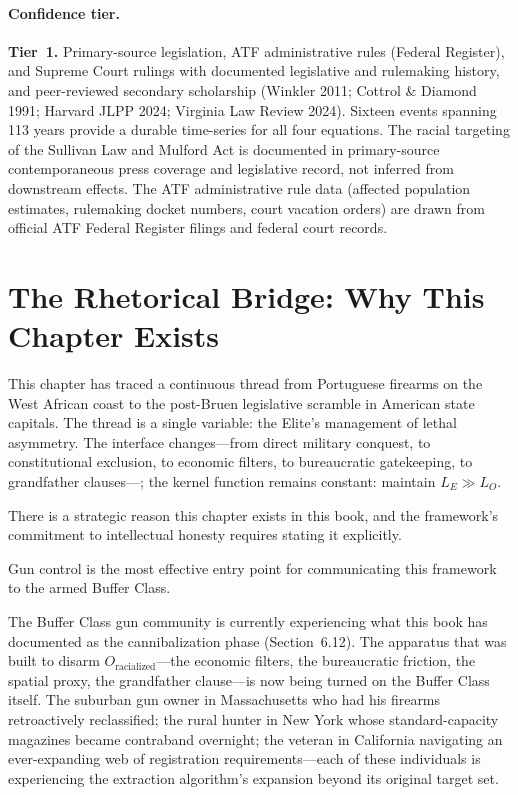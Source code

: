\paragraph{Confidence tier.}
\textbf{Tier~1.} Primary-source legislation, ATF administrative rules (Federal Register), and Supreme Court rulings with documented legislative and rulemaking history, and peer-reviewed secondary scholarship (Winkler 2011; Cottrol \& Diamond 1991; Harvard JLPP 2024; Virginia Law Review 2024). Sixteen events spanning 113 years provide a durable time-series for all four equations. The racial targeting of the Sullivan Law and Mulford Act is documented in primary-source contemporaneous press coverage and legislative record, not inferred from downstream effects. The ATF administrative rule data (affected population estimates, rulemaking docket numbers, court vacation orders) are drawn from official ATF Federal Register filings and federal court records.

\section{The Rhetorical Bridge: Why This Chapter Exists}

This chapter has traced a continuous thread from Portuguese firearms on the West African coast to the post-Bruen legislative scramble in American state capitals. The thread is a single variable: the Elite's management of lethal asymmetry. The interface changes---from direct military conquest, to constitutional exclusion, to economic filters, to bureaucratic gatekeeping, to grandfather clauses---; the kernel function remains constant: maintain $L_E \gg L_O$.

There is a strategic reason this chapter exists in this book, and the framework's commitment to intellectual honesty requires stating it explicitly.

Gun control is the most effective entry point for communicating this framework to the armed Buffer Class.

The Buffer Class gun community is currently experiencing what this book has documented as the cannibalization phase (Section~6.12). The apparatus that was built to disarm $O_{\text{racialized}}$---the economic filters, the bureaucratic friction, the spatial proxy, the grandfather clause---is now being turned on the Buffer Class itself. The suburban gun owner in Massachusetts who had his firearms retroactively reclassified; the rural hunter in New York whose standard-capacity magazines became contraband overnight; the veteran in California navigating an ever-expanding web of registration requirements---each of these individuals is experiencing the extraction algorithm's expansion beyond its original target set.

